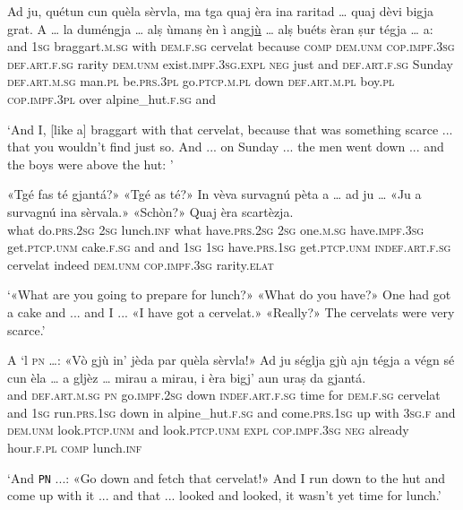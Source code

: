 \begin{linenumbers}
	\gll Ad ju, quétun cun quèla sèrvla, ma tga quaj èra ina raritad … quaj dèvi bigja grat. A … la duméngja … alṣ ùmanṣ èn ì angj\underline{ù} … alṣ buéts èran ṣur tégja … a:\\
	and \textsc{1sg} braggart.\textsc{m.sg} with \textsc{dem.f.sg} cervelat because \textsc{comp} \textsc{dem.unm} \textsc{cop.impf.3sg} \textsc{def.art.f.sg} rarity {} \textsc{dem.unm} exist.\textsc{impf.3sg.expl} \textsc{neg} just and {} \textsc{def.art.f.sg} Sunday {} \textsc{def.art.m.sg} man.\textsc{pl} be.\textsc{prs.3pl} go.\textsc{ptcp.m.pl} down {} \textsc{def.art.m.pl} boy.\textsc{pl} \textsc{cop.impf.3pl} over alpine\_hut.\textsc{f.sg} {} and\\
\end{linenumbers}
\medskip
\glt `And I, [like a] braggart with that cervelat, because that was something scarce ... that you wouldn't find just so. And ... on Sunday ... the men went down ... and the boys were above the hut: '
\medskip

\begin{linenumbers}
	\gll «Tgé fas té gjantá?» «Tgé as té?» In vèva survagnú pèta a … ad ju … «Ju a survagnú ina sèrvala.» «Schòn?» Quaj èra scartèzja.\\
	what do.\textsc{prs.2sg} \textsc{2sg} lunch.\textsc{inf} what have.\textsc{prs.2sg} \textsc{2sg}  one.\textsc{m.sg} have.\textsc{impf.3sg} get.\textsc{ptcp.unm} cake.\textsc{f.sg} and {} and \textsc{1sg} {} \textsc{1sg} have.\textsc{prs.1sg} get.\textsc{ptcp.unm} \textsc{indef.art.f.sg} cervelat indeed \textsc{dem.unm} \textsc{cop.impf.3sg} rarity.\textsc{elat}\\
\end{linenumbers}
\medskip
\glt `«What are you going to prepare for lunch?» «What do you have?» One had got a cake and ... and I ... «I have got a cervelat.» «Really?» The cervelats were very scarce.'
\medskip

\begin{linenumbers}
	\gll  A ‘l \textsc{pn} …: «Vò gjù in' jèda par quèla sèrvla!» Ad ju séglja gjù ajn tégja a végn sé cun èla … a gljèz … mirau a mirau, i èra bigj' aun uraṣ da gjantá.\\
and \textsc{def.art.m.sg} \textsc{pn} {} go.\textsc{impf.2sg} down \textsc{indef.art.f.sg} time for \textsc{dem.f.sg} cervelat and \textsc{1sg} run.\textsc{prs.1sg} down in alpine\_hut.\textsc{f.sg} and come.\textsc{prs.1sg} up with \textsc{3sg.f} {} and \textsc{dem.unm} {} look.\textsc{ptcp.unm} and look\textsc{.ptcp.unm} \textsc{expl} \textsc{cop.impf.3sg} \textsc{neg} already hour.\textsc{f.pl} \textsc{comp} lunch.\textsc{inf}	\\
\end{linenumbers}
\medskip
\glt `And \texttt{PN} ...: «Go down and fetch that cervelat!» And I run down to the hut and come up with it ... and that ... looked and looked, it wasn't yet time for lunch.'
\medskip

